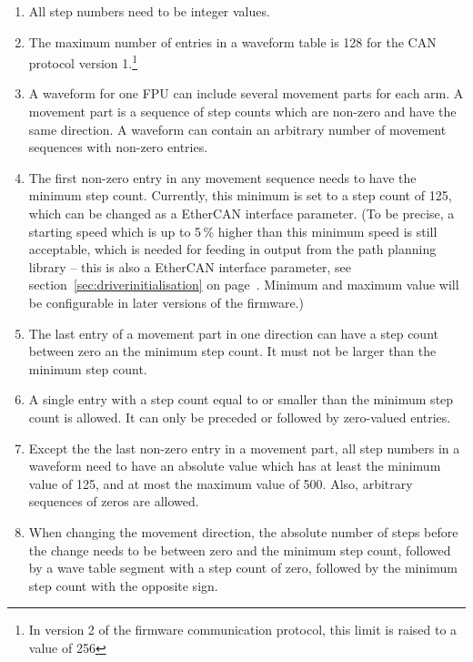 \documentclass[11pt,a4paper]{scrartcl}
\begin{document}
\begin{enumerate}

\item All step numbers need to be integer values.

\item The maximum number of entries in a waveform table is 128 for the
  CAN protocol version 1.\footnote{In version 2 of the firmware
    communication protocol, this limit is raised to a value of 256}
  
\item A waveform for one FPU can include several movement parts for
  each arm. A movement part is a sequence of step counts which are
  non-zero and have the same direction.  A waveform can contain an
  arbitrary number of movement sequences with non-zero entries.

\item The first non-zero entry in any movement sequence needs to have
  the minimum step count.  Currently, this minimum is set to a step
  count of 125, which can be changed as a EtherCAN interface parameter. (To be
  precise, a starting speed which is up to 5\,\% higher than this
  minimum speed is still acceptable, which is needed for feeding in
  output from the path planning library -- this is also a EtherCAN interface
  parameter, see section~\ref{sec:driverinitialisation} on
  page~\pageref{sec:driverinitialisation}. Minimum and maximum value
  will be configurable in later versions of the firmware.)

\item The last entry of a movement part in one direction can have a
  step count between zero an the minimum step count. It must not be
  larger than the minimum step count.
  
\item A single entry with a step count equal to or smaller than the
  minimum step count is allowed. It can only be preceded or followed
  by zero-valued entries.
  
\item Except the the last non-zero entry in a movement part, all step
  numbers in a waveform need to have an absolute value which has at
  least the minimum value of 125, and at most the maximum value of
  500. Also, arbitrary sequences of zeros are allowed.

\item When changing the movement direction, the absolute number of
  steps before the change needs to be between zero and the minimum
  step count, followed by a wave table segment with a step count of
  zero, followed by the minimum step count with the opposite sign.


\end{enumerate}
\end{document}
